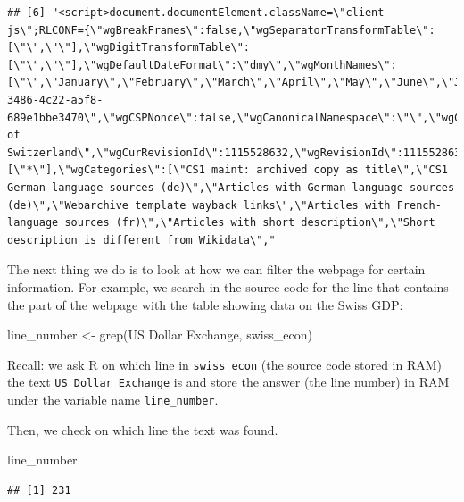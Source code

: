 \documentclass[
  12pt,
]{style/krantz}
\newenvironment{Shaded}{\begin{snugshade}}{\end{snugshade}}
\newcommand{\FunctionTok}[1]{\textcolor[rgb]{0.00,0.00,0.00}{#1}}
\newcommand{\NormalTok}[1]{#1}
\newcommand{\OtherTok}[1]{\textcolor[rgb]{0.56,0.35,0.01}{#1}}
\newcommand{\StringTok}[1]{\textcolor[rgb]{0.31,0.60,0.02}{#1}}
\begin{document}
\begin{verbatim}
## [6] "<script>document.documentElement.className=\"client-js\";RLCONF={\"wgBreakFrames\":false,\"wgSeparatorTransformTable\":[\"\",\"\"],\"wgDigitTransformTable\":[\"\",\"\"],\"wgDefaultDateFormat\":\"dmy\",\"wgMonthNames\":[\"\",\"January\",\"February\",\"March\",\"April\",\"May\",\"June\",\"July\",\"August\",\"September\",\"October\",\"November\",\"December\"],\"wgRequestId\":\"15e073fa-3486-4c22-a5f8-689e1bbe3470\",\"wgCSPNonce\":false,\"wgCanonicalNamespace\":\"\",\"wgCanonicalSpecialPageName\":false,\"wgNamespaceNumber\":0,\"wgPageName\":\"Economy_of_Switzerland\",\"wgTitle\":\"Economy of Switzerland\",\"wgCurRevisionId\":1115528632,\"wgRevisionId\":1115528632,\"wgArticleId\":27465,\"wgIsArticle\":true,\"wgIsRedirect\":false,\"wgAction\":\"view\",\"wgUserName\":null,\"wgUserGroups\":[\"*\"],\"wgCategories\":[\"CS1 maint: archived copy as title\",\"CS1 German-language sources (de)\",\"Articles with German-language sources (de)\",\"Webarchive template wayback links\",\"Articles with French-language sources (fr)\",\"Articles with short description\",\"Short description is different from Wikidata\","
\end{verbatim}

The next thing we do is to look at how we can filter the webpage for certain information. For example, we search in the source code for the line that contains the part of the webpage with the table showing data on the Swiss GDP:

\begin{Shaded}
\begin{Highlighting}[]
\NormalTok{line\_number }\OtherTok{\textless{}{-}} \FunctionTok{grep}\NormalTok{(}\StringTok{\textquotesingle{}US Dollar Exchange\textquotesingle{}}\NormalTok{, swiss\_econ)}
\end{Highlighting}
\end{Shaded}

Recall: we ask R on which line in \texttt{swiss\_econ} (the source code stored in RAM) the text \texttt{US\ Dollar\ Exchange} is and store the answer (the line number) in RAM under the variable name \texttt{line\_number}.

Then, we check on which line the text was found.

\begin{Shaded}
\begin{Highlighting}[]
\NormalTok{line\_number}
\end{Highlighting}
\end{Shaded}

\begin{verbatim}
## [1] 231
\end{verbatim}
\end{document}
